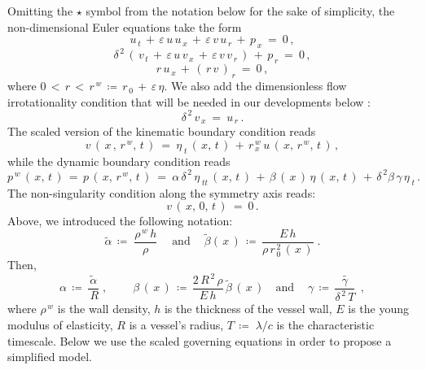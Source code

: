 \documentclass[alpha-refs, 12pt]{wiley-article}
\newcommand{\eps}{\varepsilon}
\begin{document}
Omitting the $\star$ symbol from the notation below for the sake of simplicity, the non-dimensional Euler equations take the form \citep{Mitsotakis2018}
\begin{equation}\label{eq:momentx}
  u_{\,t}\,+\,\eps\,u\,u_{\,x}\,+\,\eps\,v\, u_{\,r}\,+\,p_{\,x}\ =\ 0\,,
\end{equation}
\begin{equation}\label{eq:momenty}
  \delta^{\,2}\,(\,v_{\,t}\,+\,\eps\,u\,v_{\,x}\,+\,\eps\,v \,v_{\,r}\,)\,+\,p_{\,r}\ =\ 0\,,
\end{equation}
\begin{equation}\label{eq:cont}
  r\,u_{\,x}\,+\,(\,r\,v\,)_{\,r}\ =\ 0\,,
\end{equation}
where $0\, < \,r\, <\, r^{\,w}\,\coloneqq\,r_{\,0}\,+\,\eps\,\eta$.
We also add the dimensionless flow irrotationality condition that will be needed in our developments below \citep{Landau1987}:
\begin{equation}\label{eq:irr}
  \delta^{\,2}\,v_{\,x}\ =\ u_{\,r}\,.
\end{equation}
The scaled version of the kinematic boundary condition reads
\begin{equation}\label{eq:kin}
  v\,(\,x\,,\,r^{\,w},\,t\,)\ =\ \eta_{\;t}\,(\,x,\,t\,)\,+\,r_{\,x}^{\,w}\,u\,(\,x,\,r^{\,w},\,t\,)\,,
\end{equation}
while the dynamic boundary condition reads
\begin{equation}\label{eq:dyn}
  p^{\,w}\,(\,x,\,t\,)\,=\,p\,(\,x,\,r^{\,w},\,t\,)\ =\ \alpha\,\delta^{\,2}\,\eta_{\;tt}\,(\,x,\,t\,)\,+\,\beta\,(\,x\,)\,\eta\,(\,x,\,t\,)\,+\,\delta^{\,2}\beta\,\gamma\,\eta_{\;t}\,.
\end{equation}
The non-singularity condition along the symmetry axis reads:
\begin{equation}\label{eq:zero}
  v\,(\,x,\,0,\,t\,)\ =\ 0\,.
\end{equation}
Above, we introduced the following notation:
\begin{equation*}
  \tilde{\alpha}\,\coloneqq\;\frac{\rho^{\,w}\,h}{\rho}\; \quad \text{and} \ \quad \tilde{\beta}(\,x\,)\,\coloneqq\, \frac{E\,h}{\rho\,r_{\,0}^{\,2}\,(\,x\,)}\;.
\end{equation*}
Then,
\begin{equation*}
  \alpha\,\coloneqq\,\frac{\tilde{\alpha}}{\,R}\;, \quad \ \quad \beta\,(\,x\,)\,\coloneqq\,\frac{2\,R^{\,2}\,\rho}{E\,h}\,\tilde{\beta}\,(\,x\,) \quad \text{and} \ \quad \gamma\,\coloneqq\,\tilde{\frac{\gamma }{\delta^{\,2}\,T}\;}\,,
\end{equation*}
where $\rho^{\,w}$ is the wall density, $h$ is the thickness of the vessel wall, $E$ is the young modulus of elasticity, $R$ is a vessel's radius, $T\, \coloneqq \;\displaystyle{\lambda}/{c}$ is the characteristic timescale. Below we use the scaled governing equations in order to propose a simplified model.
\end{document}
